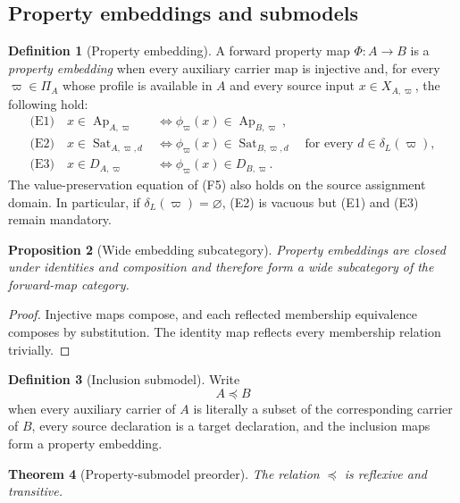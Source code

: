 \documentclass[11pt]{article}
\newcommand{\Ap}{\operatorname{Ap}}
\newcommand{\Sat}{\operatorname{Sat}}
\newtheorem{theorem}{Theorem}[section]
\newtheorem{proposition}[theorem]{Proposition}
\theoremstyle{definition}
\newtheorem{definition}[theorem]{Definition}
\theoremstyle{remark}
\begin{document}
\subsection{Property embeddings and submodels}

\begin{definition}[Property embedding]
A forward property map \(\Phi:A\to B\) is a \emph{property embedding} when every auxiliary carrier map is injective and, for every \(\varpi\in\Pi_A\) whose profile is available in \(A\) and every source input \(x\in X_{A,\varpi}\), the following hold:
\[
\begin{aligned}
\text{(E1)}\quad x\in\Ap_{A,\varpi}
&\Longleftrightarrow
\phi_{\varpi}(x)\in\Ap_{B,\varpi},\\
\text{(E2)}\quad x\in\Sat_{A,\varpi,d}
&\Longleftrightarrow
\phi_{\varpi}(x)\in\Sat_{B,\varpi,d}
\quad\text{for every }d\in\delta_L(\varpi),\\
\text{(E3)}\quad x\in D_{A,\varpi}
&\Longleftrightarrow
\phi_{\varpi}(x)\in D_{B,\varpi}.
\end{aligned}
\]
The value-preservation equation of (F5) also holds on the source assignment domain.
In particular, if \(\delta_L(\varpi)=\varnothing\), (E2) is vacuous but (E1) and (E3) remain mandatory.
\end{definition}

\begin{proposition}[Wide embedding subcategory]
Property embeddings are closed under identities and composition and therefore form a wide subcategory of the forward-map category.
\end{proposition}

\begin{proof}
Injective maps compose, and each reflected membership equivalence composes by substitution.
The identity map reflects every membership relation trivially.
\end{proof}

\begin{definition}[Inclusion submodel]
Write
\[
A\preccurlyeq B
\]
when every auxiliary carrier of \(A\) is literally a subset of the corresponding carrier of \(B\), every source declaration is a target declaration, and the inclusion maps form a property embedding.
\end{definition}

\begin{theorem}[Property-submodel preorder]
The relation \(\preccurlyeq\) is reflexive and transitive.
\end{theorem}
\end{document}
